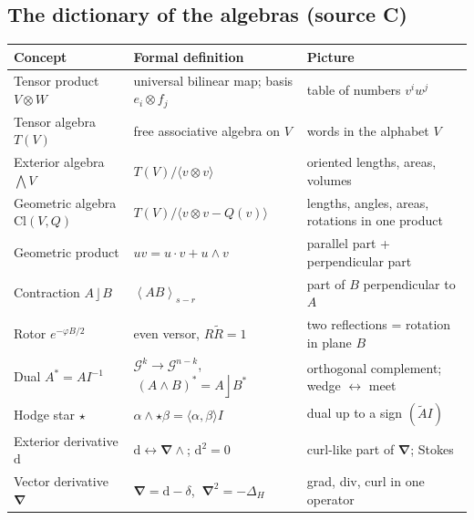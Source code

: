 \documentclass[11pt,a4paper]{article}
\renewcommand{\arraystretch}{1.25}
\numberwithin{equation}{section}
\theoremstyle{definition}
\theoremstyle{plain}
\newcommand{\dd}{\mathrm{d}}
\newcommand{\Cl}{\mathrm{Cl}}
\newcommand{\GA}{\mathcal{G}}
\newcommand{\gr}[2]{\left\langle #1 \right\rangle_{#2}}
\newcommand{\rev}[1]{\widetilde{#1}}
\newcommand{\lc}{\mathbin{\rfloor}}
\newcommand{\pss}{I}
\newcommand{\dual}[1]{#1^{\ast}}
\newcommand{\hodge}{\star}
\newcommand{\codiff}{\delta}
\newcommand{\vd}{\boldsymbol{\nabla}}               %
\begin{document}
\subsection{The dictionary of the algebras (source C)}
\begin{center}
\renewcommand{\arraystretch}{1.35}
\begin{tabular}{p{4.6cm}p{5.6cm}p{4.6cm}}
\hline
\textbf{Concept} & \textbf{Formal definition} & \textbf{Picture}\\\hline
Tensor product $V\otimes W$ & universal bilinear map; basis $e_i\otimes f_j$ & table of numbers $v^iw^j$\\
Tensor algebra $T(V)$ & free associative algebra on $V$ & words in the alphabet $V$\\
Exterior algebra $\bigwedge V$ & $T(V)/\langle v\otimes v\rangle$ & oriented lengths, areas, volumes\\
Geometric algebra $\Cl(V,Q)$ & $T(V)/\langle v\otimes v-Q(v)\rangle$ & lengths, angles, areas, rotations in one product\\
Geometric product & $uv=u\cdot v+u\wedge v$ & parallel part + perpendicular part\\
Contraction $A\lc B$ & $\gr{AB}{s-r}$ & part of $B$ perpendicular to $A$\\
Rotor $e^{-\varphi B/2}$ & even versor, $R\rev R=1$ & two reflections = rotation in plane $B$\\
Dual $\dual A=A\pss^{-1}$ & $\GA^k\to\GA^{n-k}$, $\ (A\wedge B)^*=A\lc B^*$ & orthogonal complement; wedge $\leftrightarrow$ meet\\
Hodge star $\hodge$ & $\alpha\wedge\hodge\beta=\langle\alpha,\beta\rangle\pss$ & dual up to a sign $(\rev A\pss)$\\
Exterior derivative $\dd$ & $\dd\leftrightarrow\vd\wedge$; $\dd^2=0$ & curl-like part of $\vd$; Stokes\\
Vector derivative $\vd$ & $\vd=\dd-\codiff$, $\ \vd^2=-\Delta_H$ & grad, div, curl in one operator\\\hline
\end{tabular}
\end{center}
\end{document}
